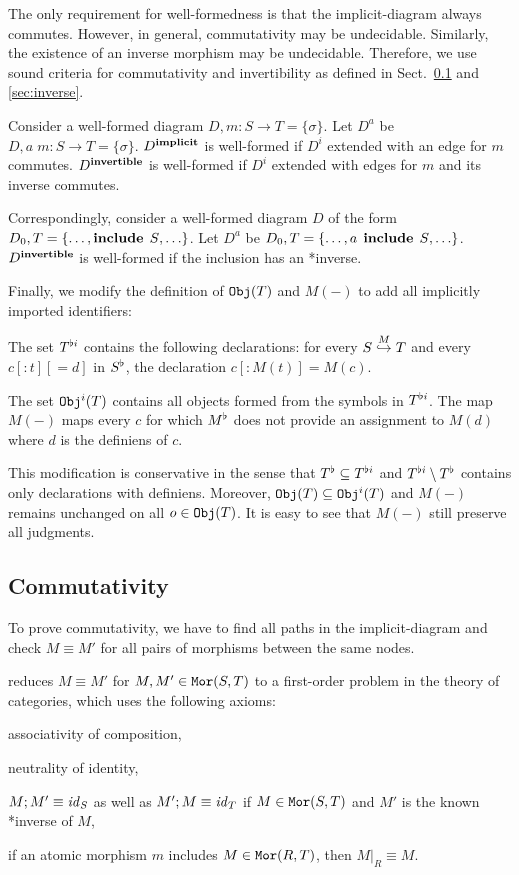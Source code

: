 The only requirement for well-formedness is that the implicit-diagram always commutes.
However, in general, commutativity may be undecidable.
Similarly, the existence of an inverse morphism may be undecidable.
Therefore, we use sound criteria for commutativity and invertibility as defined in Sect.~\ref{sec:commute} and \ref{sec:inverse}.

\begin{definition}
Consider a well-formed diagram $D, m:S\to T=\{\sigma\}$.
Let $D^a$ be $D, a\; m:S\to T=\{\sigma\}$.
$D^{\keyword{implicit}}$ is well-formed if $D^i$ extended with an edge for $m$ commutes.
$D^{\keyword{invertible}}$ is well-formed if $D^i$ extended with edges for $m$ and its inverse commutes.

Correspondingly, consider a well-formed diagram $D$ of the form $D_0, T=\{\ldots,\icl{S},\ldots\}$.
Let $D^a$ be $D_0, T=\{\ldots, a\; \icl{S},\ldots\}$.
$D^{\keyword{invertible}}$ is well-formed if the inclusion has an *inverse.
\end{definition}

Finally, we modify the definition of $\Exp{T}$ and $M(-)$ to add all implicitly imported identifiers:

\begin{definition}
The set $\flti{T}$ contains the following declarations:
for every $\ipc{M}{S}{T}$ and every $c[:t][=d]$ in $\flt{S}$, the declaration $c[:M(t)]=M(c)$.

The set $\Expi{T}$ contains all objects formed from the symbols in $\flti{T}$.
The map $M(-)$ maps every $c$ for which $\flt{M}$ does not provide an assignment to $M(d)$ where $d$ is the definiens of $c$.
\end{definition}

This modification is conservative in the sense that $\flt{T}\sq\flti{T}$ and $\flti{T}\sm\flt{T}$ contains only declarations with definiens.
Moreover, $\Exp{T}\sq\Expi{T}$ and $M(-)$ remains unchanged on all $o\in\Exp{T}$.
It is easy to see that $M(-)$ still preserve all judgments.

\subsection{Commutativity}\label{sec:commute}

To prove commutativity, we have to find all paths in the implicit-diagram and check $M\equiv M'$ for all pairs of morphisms between the same nodes.

\mmt reduces $M\equiv M'$ for $M,M'\in\Mo{S}{T}$ to a first-order problem in the theory of categories, which uses the following axioms:
\begin{compactitem}
\item associativity of composition,
\item neutrality of identity,
\item $M;M'\equiv \id{S}$ as well as $M';M\equiv\id{T}$ if $M\in\Mo{S}{T}$ and $M'$ is the known *inverse of $M$,
\item if an atomic morphism $m$ includes $M\in\Mo{R}{T}$, then $M|_R\equiv M$.
\end{compactitem}

